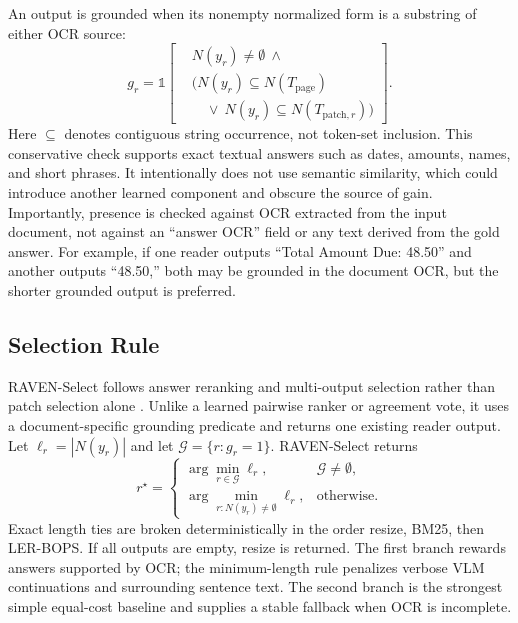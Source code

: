 \documentclass[journal]{IEEEtran}
\begin{document}
An output is grounded when its nonempty normalized form is a substring of
either OCR source:
\begin{equation}
g_r = \mathbb{1}\!\left[
\begin{aligned}
&N(y_r)\neq\emptyset \ \wedge\\[-2pt]
&\bigl(N(y_r)\subseteq N(T_{\mathrm{page}})\\[-2pt]
&\quad\vee\ N(y_r)\subseteq N(T_{\mathrm{patch},r})\bigr)
\end{aligned}
\right].
\end{equation}
Here $\subseteq$ denotes contiguous string occurrence, not token-set inclusion.
This conservative check supports exact textual answers such as dates, amounts,
names, and short phrases.  It intentionally does not use semantic similarity,
which could introduce another learned component and obscure the source of gain.
Importantly, presence is checked against OCR extracted from the input document,
not against an ``answer OCR'' field or any text derived from the gold answer.
For example, if one reader outputs ``Total Amount Due: 48.50'' and another
outputs ``48.50,'' both may be grounded in the document OCR, but the shorter
grounded output is preferred.

\subsection{Selection Rule}
RAVEN-Select follows answer reranking and multi-output selection rather than
patch selection alone \cite{rankqa,llmblender,selfconsistency}.  Unlike a
learned pairwise ranker or agreement vote, it uses a document-specific
grounding predicate and returns one existing reader output.
Let $\ell_r=|N(y_r)|$ and let $\mathcal{G}=\{r:g_r=1\}$.  RAVEN-Select returns
\begin{equation}
r^\star =
\begin{cases}
\arg\min_{r\in\mathcal{G}} \ell_r, & \mathcal{G}\neq\emptyset,\\
\arg\min_{r:N(y_r)\neq\emptyset} \ell_r, & \text{otherwise}.
\end{cases}
\label{eq:selector}
\end{equation}
Exact length ties are broken deterministically in the order resize, BM25, then
LER-BOPS.  If all outputs are empty, resize is returned.
The first branch rewards answers supported by OCR; the minimum-length rule
penalizes verbose VLM continuations and surrounding sentence text.  The second
branch is the strongest simple equal-cost baseline and supplies a stable
fallback when OCR is incomplete.
\end{document}
